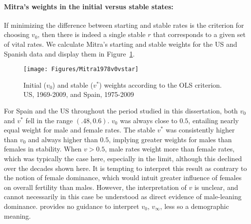 \paragraph{Mitra's weights in the initial versus stable states: } If minimizing
the difference between starting and stable rates is the criterion for choosing $v_0$, 
then there is indeed a single stable $r$ that
corresponds to a given set of vital rates. We calculate Mitra's starting and
stable weights for the US and Spanish data and display them
in Figure~\ref{fig:Mitra1978v0vstar}.

\begin{figure}[ht!]
        \centering  
          \caption{Initial ($v_0$) and stable ($v^\ast$) weights according to
          the OLS criterion. US, 1969-2009, and Spain, 1975-2009 
          \citet{mitra1978derivation}}
           \quad
           \texttt{[image: Figures/Mitra1978v0vstar]}
          \label{fig:Mitra1978v0vstar}
\end{figure}

For Spain and the US throughout the period studied in this dissertation, both
$v_0$ and $v^\ast$ fell in the range $(.48,0.6)$. $v_0$ was always
close to $0.5$, entailing nearly equal weight for male and female rates.
The stable $v^\ast$ was consistently higher than $v_0$ and always higher than
$0.5$, implying greater weights for males than females in stability. When $v >
0.5$, male rates weight more than female rates, which was typically the case
here, especially in the limit, although this declined over the decades shown here. It is
tempting to interpret this result as contrary to the notion of female dominance,
which would intuit greater influence of females on overall fertility than
males. However, the interpretation of $v$ is unclear, and cannot necessarily in
this case be understood as direct evidence of male-leaning dominance.
\citet{mitra1978derivation} provides no guidance to interpret $v_0$, $v_\infty$,
less so a demographic meaning. 
\FloatBarrier
